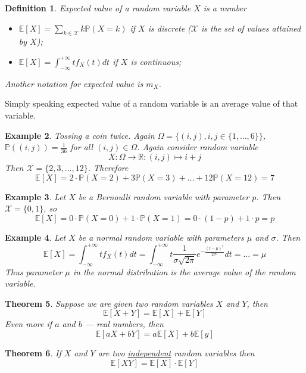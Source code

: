\documentclass[12pt]{article}
\newtheorem{theorem}{Theorem}[subsection]
\newtheorem{definition}[theorem]{Definition}
\newtheorem{example}[theorem]{Example}
\begin{document}
\begin{definition} Expected value of a random variable $X$ is a number
\begin{itemize}
    \item $\mathbb{E}[X]=\sum_{k\in \mathcal{X}} k \mathbb{P}(X=k)$ if $X$ is discrete ($\mathcal{X}$ is the set of values attained by $X$);
    \item $\mathbb{E}[X]=\int_{-\infty}^{+\infty}t f_X(t)dt$ if $X$ is continuous;
\end{itemize}
Another notation for expected value is $m_X$.
\end{definition}

Simply speaking expected value of a random variable is an average value of that variable.

\begin{example} Tossing a coin twice. Again $\Omega=\{(i,j), i,j\in\{1,\ldots,6\}\}$, $\mathbb{P}((i,j))=\frac{1}{36}$ for all $(i,j)\in \Omega$. Again consider random variable
$$
X:\Omega\to\mathbb{R}:(i,j)\mapsto i+j 
$$
Then $\mathcal{X}=\{2,3,\ldots,12\}$. Therefore
$$
\mathbb{E}[X]
=2\cdot \mathbb{P}(X=2)+3\mathbb{P}(X=3)+\ldots+12\mathbb{P}(X=12)
=7
$$
\end{example}

\begin{example} Let $X$ be a Bernoulli random variable with parameter $p$. Then $\mathcal{X}=\{0,1\}$, so
$$
\mathbb{E}[X]=0\cdot \mathbb{P}(X=0)+1\cdot \mathbb{P}(X=1)=0 \cdot (1-p) + 1 \cdot p = p
$$
\end{example}

\begin{example} Let $X$ be a normal random variable with parameters $\mu$ and $\sigma$. Then 
$$
\mathbb{E}[X]
=\int_{-\infty}^{+\infty}t f_X(t)dt
=\int_{-\infty}^{+\infty}t \frac{1}{\sigma\sqrt{2\pi }}e^{-\frac{(t-\mu)^2}{2\sigma^2}} dt
=\ldots
=\mu
$$
Thus parameter $\mu$ in the normal distribution is the average value of the random variable.
\end{example}

\begin{theorem} Suppose we are given two random variables $X$ and $Y$, then
$$
\mathbb{E}[X+Y]=\mathbb{E}[X]+\mathbb{E}[Y]
$$
Even more if $a$ and $b$ --- real numbers, then
$$
\mathbb{E}[aX+bY]=a\mathbb{E}[X]+b\mathbb{E}[y]
$$
\end{theorem}

\begin{theorem} If $X$ and $Y$ are two \underline{independent} random variables then
$$
\mathbb{E}[XY]=\mathbb{E}[X]\cdot\mathbb{E}[Y]
$$
\end{theorem}
\end{document}
